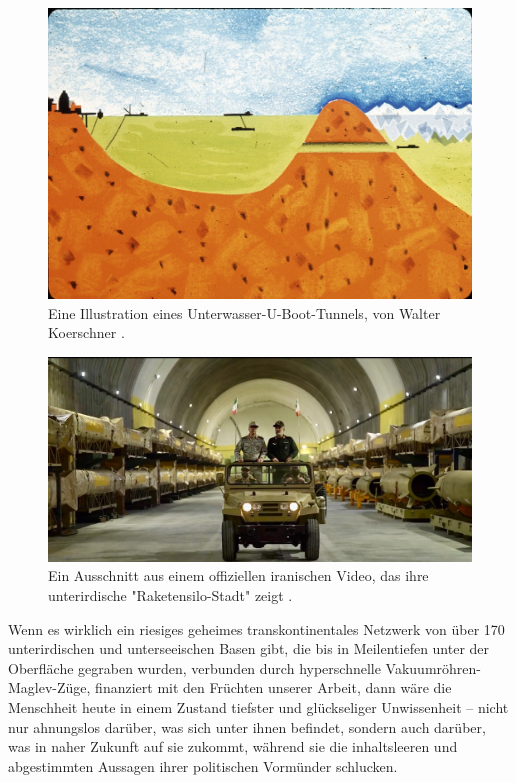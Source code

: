 \documentclass[10pt,twocolumn,letterpaper]{article}
\begin{document}
\begin{figure}[t]
\begin{center}
   \includegraphics[width=1\linewidth]{sub.jpg}
\end{center}
   \caption{Eine Illustration eines Unterwasser-U-Boot-Tunnels, von Walter Koerschner \cite{22,23}.}
\label{fig:6}
\label{fig:onecol}

\end{figure}

\begin{figure}[t]
\begin{center}
   \includegraphics[width=1\linewidth]{iran.jpeg}
\end{center}
   \caption{Ein Ausschnitt aus einem offiziellen iranischen Video, das ihre unterirdische "Raketensilo-Stadt" zeigt \cite{39,40}.}
\label{fig:12}
\label{fig:onecol}
\end{figure}

Wenn es wirklich ein riesiges geheimes transkontinentales Netzwerk von über 170 unterirdischen und unterseeischen Basen gibt, die bis in Meilentiefen unter der Oberfläche gegraben wurden, verbunden durch hyperschnelle Vakuumröhren-Maglev-Züge, finanziert mit den Früchten unserer Arbeit, dann wäre die Menschheit heute in einem Zustand tiefster und glückseliger Unwissenheit – nicht nur ahnungslos darüber, was sich unter ihnen befindet, sondern auch darüber, was in naher Zukunft auf sie zukommt, während sie die inhaltsleeren und abgestimmten Aussagen ihrer politischen Vormünder schlucken.
\end{document}
